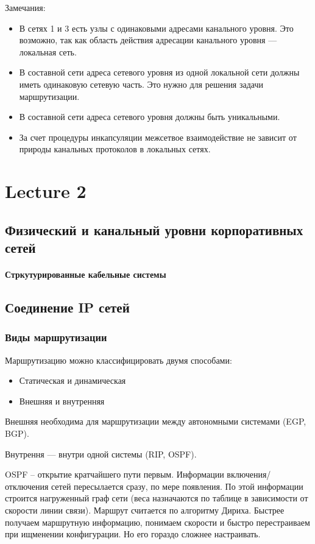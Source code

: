 \documentclass[10pt,a4paper,oneside,titlepage]{report}
\theoremstyle{defenition}
\begin{document}
Замечания:
\begin{itemize}
	\item В сетях 1 и 3 есть узлы с одинаковыми адресами канального уровня. Это возможно, так как область действия адресации канального уровня --- локальная сеть.
	\item В составной сети адреса сетевого уровня из одной локальной сети должны иметь одинаковую сетевую часть. Это нужно для решения задачи маршрутизации.
	\item В составной сети адреса сетевого уровня должны быть уникальными.
	\item За счет процедуры инкапсуляции межсетвое взаимодействие не зависит от природы канальных протоколов в локальных сетях.
\end{itemize}

\chapter{Lecture 2}

\section{Физический и канальный уровни корпоративных сетей}

\subsubsection{Стркутурированные кабельные системы} %

\section{Соединение IP сетей}

\subsection{Виды маршрутизации}

Маршрутизацию можно классифицировать двумя способами:
\begin{itemize}
	\item Статическая и динамическая
	\item Внешняя и внутренняя
\end{itemize}

Внешняя необходима для маршрутизации между автономными системами (EGP, BGP).

Внутрення --- внутри одной системы (RIP, OSPF).

OSPF -- открытие кратчайшего пути первым. Информации включения/отключения сетей пересылается сразу, по мере появления. По этой информации строится нагруженный граф сети (веса назначаются по таблице в зависимости от скорости линии связи). Маршрут считается по алгоритму Дириха. Быстрее получаем маршрутную информацию, понимаем скорости и быстро перестраиваем при ищменении конфигурации. Но его гораздо сложнее настраивать. 
\end{document}
